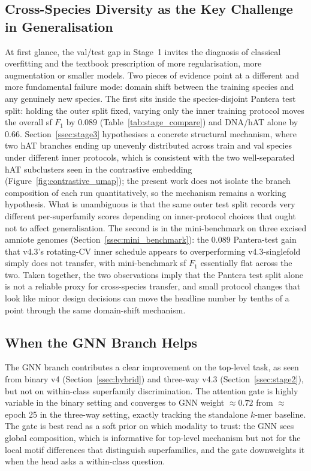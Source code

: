 \documentclass[12pt]{article}
\begin{document}
\subsection{Cross-Species Diversity as the Key Challenge in Generalisation}\label{ssec:disc_species_shift}

At first glance, the val/test gap in Stage~1 invites the diagnosis of classical overfitting and the textbook prescription of more regularisation, more augmentation or smaller models. Two pieces of evidence point at a different and more fundamental failure mode: domain shift between the training species and any genuinely new species. The first sits inside the species-disjoint Pantera test split: holding the outer split fixed, varying only the inner training protocol moves the overall sf $F_1$ by $0.089$ (Table~\ref{tab:stage_compare}) and DNA/hAT alone by $0.66$. Section~\ref{ssec:stage3} hypothesises a concrete structural mechanism, where two hAT branches ending up unevenly distributed across train and val species under different inner protocols, which is consistent with the two well-separated hAT subclusters seen in the contrastive embedding (Figure~\ref{fig:contrastive_umap}); the present work does not isolate the branch composition of each run quantitatively, so the mechanism remains a working hypothesis. What is unambiguous is that the same outer test split records very different per-superfamily scores depending on inner-protocol choices that ought not to affect generalisation. The second is in the mini-benchmark on three excised amniote genomes (Section~\ref{ssec:mini_benchmark}): the $0.089$ Pantera-test gain that v4.3's rotating-CV inner schedule appears to overperforming v4.3-singlefold simply does not transfer, with mini-benchmark sf $F_1$ essentially flat across the two. Taken together, the two observations imply that the Pantera test split alone is not a reliable proxy for cross-species transfer, and small protocol changes that look like minor design decisions can move the headline number by tenths of a point through the same domain-shift mechanism.

\subsection{When the GNN Branch Helps}\label{ssec:hybrid_disc}

The GNN branch contributes a clear improvement on the top-level task, as seen from binary v4 (Section~\ref{ssec:hybrid}) and three-way v4.3 (Section~\ref{ssec:stage2}), but not on within-class superfamily discrimination. The attention gate is highly variable in the binary setting and converges to GNN weight $\approx 0.72$ from $\approx$ epoch 25 in the three-way setting, exactly tracking the standalone $k$-mer baseline. The gate is best read as a soft prior on which modality to trust: the GNN sees global composition, which is informative for top-level mechanism but not for the local motif differences that distinguish superfamilies, and the gate downweights it when the head asks a within-class question. 
\end{document}
